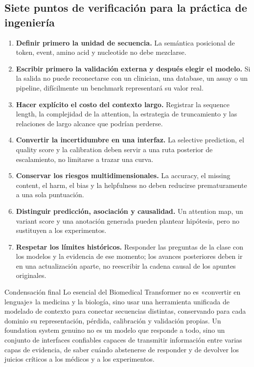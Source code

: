 \documentclass[a4paper]{article}
\begin{document}

\subsection{Siete puntos de verificación para la práctica de ingeniería}

\begin{enumerate}
  \item \textbf{Definir primero la unidad de secuencia.} La semántica posicional de token, event, amino acid y nucleotide no debe mezclarse.
  \item \textbf{Escribir primero la validación externa y después elegir el modelo.} Si la salida no puede reconectarse con un clinician, una database, un assay o un pipeline, difícilmente un benchmark representará su valor real.
  \item \textbf{Hacer explícito el costo del contexto largo.} Registrar la sequence length, la complejidad de la attention, la estrategia de truncamiento y las relaciones de largo alcance que podrían perderse.
  \item \textbf{Convertir la incertidumbre en una interfaz.} La selective prediction, el quality score y la calibration deben servir a una ruta posterior de escalamiento, no limitarse a trazar una curva.
  \item \textbf{Conservar los riesgos multidimensionales.} La accuracy, el missing content, el harm, el bias y la helpfulness no deben reducirse prematuramente a una sola puntuación.
  \item \textbf{Distinguir predicción, asociación y causalidad.} Un attention map, un variant score y una anotación generada pueden plantear hipótesis, pero no sustituyen a los experimentos.
  \item \textbf{Respetar los límites históricos.} Responder las preguntas de la clase con los modelos y la evidencia de ese momento; los avances posteriores deben ir en una actualización aparte, no reescribir la cadena causal de los apuntes originales.
\end{enumerate}

\begin{importantbox}{Condensación final}
Lo esencial del Biomedical Transformer no es «convertir en lenguaje» la medicina y la biología, sino usar una herramienta unificada de modelado de contexto para conectar secuencias distintas, conservando para cada dominio su representación, pérdida, calibración y validación propias. Un foundation system genuino no es un modelo que responde a todo, sino un conjunto de interfaces confiables capaces de transmitir información entre varias capas de evidencia, de saber cuándo abstenerse de responder y de devolver los juicios críticos a los médicos y a los experimentos.
\end{importantbox}
\end{document}
